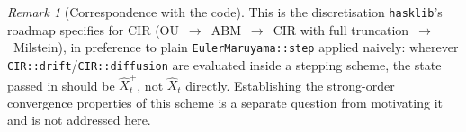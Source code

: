 \documentclass[11pt]{article}
\theoremstyle{plain}
\theoremstyle{definition}
\theoremstyle{remark}
\newtheorem{remark}{Remark}
\begin{document}
\begin{remark}[Correspondence with the code]
This is the discretisation \texttt{hasklib}'s roadmap specifies for
CIR (OU~$\to$~ABM~$\to$~CIR with full truncation~$\to$~Milstein), in
preference to plain \texttt{EulerMaruyama::step} applied naively:
wherever \texttt{CIR::drift}/\texttt{CIR::diffusion} are evaluated
inside a stepping scheme, the state passed in should be $\hat X_t^+$,
not $\hat X_t$ directly. Establishing the strong-order convergence
properties of this scheme is a separate question from motivating it
and is not addressed here.
\end{remark}



\end{document}
